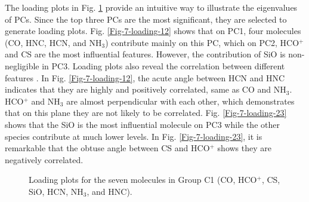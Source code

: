 \documentclass{aa}
\begin{document}
\begin{CJK*}{UTF8}{gbsn}
   The loading plots in Fig. \ref{Fig-7-loading} provide an intuitive way to illustrate the eigenvalues of PCs. 
   Since the top three PCs are the most significant, they are selected to generate loading plots. 
   Fig. \ref{Fig-7-loading-12} shows that on PC1, four molecules (CO, HNC, HCN, and NH$_3$) contribute mainly on this PC, which on PC2, HCO$^+$ and CS are the most influential features.
   However, the contribution of SiO is non-negligible in PC3. 
   Loading plots also reveal the correlation between different features \citep{al2015principal}.
   In Fig. \ref{Fig-7-loading-12}, the acute angle between HCN and HNC indicates that they are highly and positively correlated, same as CO and NH$_3$. 
   HCO$^+$ and NH$_3$ are almost perpendicular with each other, which demonstrates that on this plane they are not likely to be correlated. Fig. \ref{Fig-7-loading-23} shows that the SiO is the most influential molecule on PC3 while the other species contribute at much lower levels. 
   In Fig. \ref{Fig-7-loading-23}, it is remarkable that the obtuse angle between CS and HCO$^+$ shows they are negatively correlated.
   
   
    \begin{figure}[htbp]
        \centering  
        \caption{Loading plots for the seven molecules in Group C1 (CO, HCO$^+$, CS, SiO, HCN, NH$_3$, and HNC).}
        \label{Fig-7-loading}
    \end{figure}


\end{CJK*}
\end{document}
